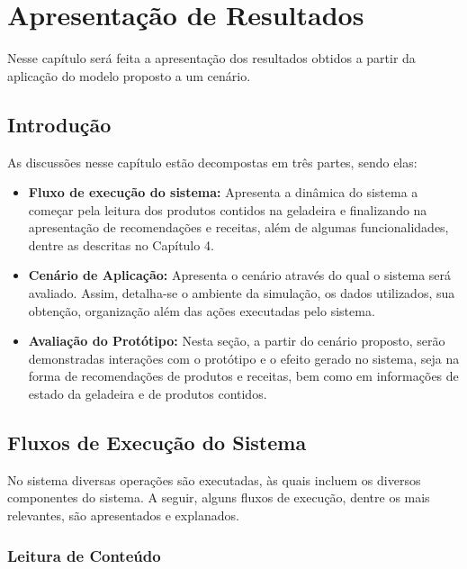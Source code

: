 \chapter{Apresentação de Resultados}
\label{cap:avaliacao_sistema}

Nesse capítulo será feita a apresentação dos resultados obtidos a partir da aplicação do modelo proposto a um cenário.

\section{Introdução}

As discussões nesse capítulo estão decompostas em três partes, sendo elas:

\begin{itemize} \parskip -4pt
    \item \textbf{Fluxo de execução do sistema:} Apresenta a dinâmica do sistema a começar pela leitura dos produtos contidos na geladeira e finalizando na apresentação de recomendações e receitas, além de algumas funcionalidades, dentre as descritas no Capítulo 4.
    \item \textbf{Cenário de Aplicação:} Apresenta o cenário através do qual o sistema será avaliado. Assim, detalha-se o ambiente da simulação, os dados utilizados, sua obtenção, organização além das ações executadas pelo sistema.
    \item \textbf{Avaliação do Protótipo:} Nesta seção, a partir do cenário proposto, serão demonstradas interações com o protótipo e o efeito gerado no sistema, seja na forma de recomendações de produtos e receitas, bem como em informações de estado da geladeira e de produtos contidos.
\end{itemize}

\section{Fluxos de Execução do Sistema}

No sistema diversas operações são executadas, às quais incluem os diversos componentes do sistema. A seguir, alguns fluxos de execução, dentre os mais relevantes, são apresentados e explanados.

\subsection{Leitura de Conteúdo}

